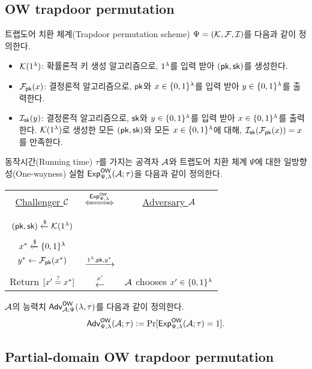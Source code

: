 \subsection{OW trapdoor permutation}
트랩도어 치환 체계(Trapdoor permutation scheme) $\Psi = (\mathcal{K}, \mathcal{F}, \mathcal{I})$를 다음과
같이 정의한다.
\begin{itemize}
	\item $\mathcal{K}(1^{\lambda})$: 확률론적 키 생성 알고리즘으로, $1^{\lambda}$를 입력 받아
		$(\textsf{pk}, \textsf{sk})$를 생성한다.
	\item $\mathcal{F}_{\textsf{pk}}(x)$: 결정론적 알고리즘으로, $\textsf{pk}$와 $x \in \{0, 1\}^{\lambda}$를
	입력 받아 $y \in \{0, 1\}^{\lambda}$를 출력한다.
	\item $\mathcal{I}_{\textsf{sk}}(y)$: 결정론적 알고리즘으로, $\textsf{sk}$와 $y \in \{0, 1\}^{\lambda}$를
		입력 받아 $x \in \{0, 1\}^{\lambda}$를 출력한다. $\mathcal{K}(1^{\lambda})$로 생성한 모든
		$(\textsf{pk}, \textsf{sk})$와 모든 $x \in \{0, 1\}^{\lambda}$에 대해, $\mathcal{I}_{\textsf{sk}}(\mathcal{F}_{\textsf{pk}}(x)) =
		x$를 만족한다.
\end{itemize}
동작시간(Running time) $\tau$를 가지는 공격자 $\mathcal{A}$와 트랩도어 치환 체계
$\Psi$에 대한 일방향성(One-wayness) 실험 $\textsf{Exp}^{\textsf{OW}}_{\Psi, \lambda}(\mathcal{A}; \tau)$을
다음과 같이 정의한다.
\begin{tcolorbox}[colback=white]
	\centering
	\begin{tabularx}{\linewidth}{CcC}
		\underline{Challenger $\mathcal{C}$} & $\xLeftrightarrow{\EXP^{\OW}_{\Psi, \lm}}$ & \underline{Adversary $\mathcal{A}$} \\
		\\
		$(\textsf{pk}, \textsf{sk}) \xleftarrow{\$} \mathcal{K}(1^{\lambda})$ & & \\
		\\
		$x^* \xleftarrow{\$} \{0, 1\}^{\lambda}$ \\ $y^* \gets \mathcal{F}_{\textsf{pk}}(x^*)$ & $\xrightarrow{1^{\lambda}, \textsf{pk}, y^*}$ & \\
		\\ 
		Return $[x' \overset{?}{=} x^*]$ & $\xleftarrow{x'}$ & $\mathcal{A}$ chooses $x' \in \{0, 1\}^{\lambda}$ \\
  \end{tabularx}
\end{tcolorbox}

$\mathcal{A}$의 능력치 $\textsf{Adv}^{\textsf{OW}}_{\mathcal{A}; \Psi}(\lambda, \tau)$를 다음과 같이 정의한다.
$$
	\textsf{Adv}^{\textsf{OW}}_{\Psi, \lambda}(\mathcal{A}; \tau) := \Pr[\textsf{Exp}^{\textsf{OW}}_{\Psi, \lambda}(\mathcal{A}; \tau) = 1].
$$

\subsection{Partial-domain OW trapdoor permutation}

